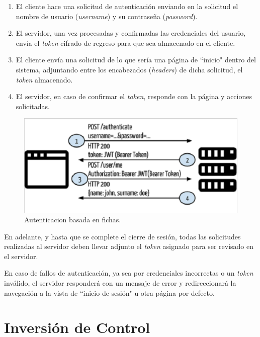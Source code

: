     \begin{enumerate}
        \item El cliente hace una solicitud de autenticación enviando en la solicitud el nombre de usuario (\textit{username}) y su contraseña (\textit{password}).
        \item El servidor, una vez procesadas y confirmadas las credenciales del usuario, envía el \textit{token} cifrado de regreso para que sea almacenado en el cliente.
        \item El cliente envía una solicitud de lo que sería una página de ``inicio" dentro del sistema, adjuntando entre los encabezados (\textit{headers}) de dicha solicitud, el \textit{token} almacenado.
        \item El servidor, en caso de confirmar el \textit{token}, responde con la página y acciones solicitadas.
    \end{enumerate}
    
    \begin{figure}[htbp!]
        \begin{center}
            \includegraphics[width=.7\textwidth]{figures/tokenbarequest}
        \end{center}
        \caption{Autenticacion basada en fichas.}
        \label{tba-request}
    \end{figure}
    
    En adelante, y hasta que se complete el cierre de sesión, todas las solicitudes realizadas al servidor deben llevar adjunto el \textit{token} asignado para ser revisado en el servidor.
    
    En caso de fallos de autenticación, ya sea por credenciales incorrectas o un \textit{token} inválido, el servidor responderá con un mensaje de error y redireccionará la navegación a la vista de ``inicio de sesión" u otra página por defecto.
    
    \section{Inversión de Control}
    
